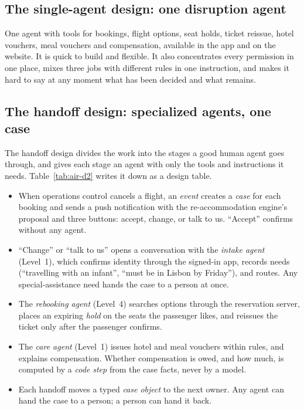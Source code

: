 \subsection{The single-agent design: one disruption agent}

One agent with tools for bookings, flight options, seat holds, ticket reissue, hotel vouchers, meal vouchers and compensation, available in the app and on the website. It is quick to build and flexible. It also concentrates every permission in one place, mixes three jobs with different rules in one instruction, and makes it hard to say at any moment what has been decided and what remains.

\subsection{The handoff design: specialized agents, one case}

The handoff design divides the work into the stages a good human agent goes through, and gives each stage an agent with only the tools and instructions it needs. Table~\ref{tab:air-d2} writes it down as a design table.
\begin{itemize}[itemsep=1pt]
  \item When operations control cancels a flight, an \emph{event} creates a \emph{case} for each booking and sends a push notification with the re-accommodation engine's proposal and three buttons: accept, change, or talk to us. ``Accept'' confirms without any agent.
  \item ``Change'' or ``talk to us'' opens a conversation with the \emph{intake agent} (Level~1), which confirms identity through the signed-in app, records needs (``travelling with an infant'', ``must be in Lisbon by Friday''), and routes. Any special-assistance need hands the case to a person at once.
  \item The \emph{rebooking agent} (Level~4) searches options through the reservation server, places an expiring \emph{hold} on the seats the passenger likes, and reissues the ticket only after the passenger confirms.
  \item The \emph{care agent} (Level~1) issues hotel and meal vouchers within rules, and explains compensation. Whether compensation is owed, and how much, is computed by a \emph{code step} from the case facts, never by a model.
  \item Each handoff moves a typed \emph{case object} to the next owner. Any agent can hand the case to a person; a person can hand it back.
\end{itemize}

